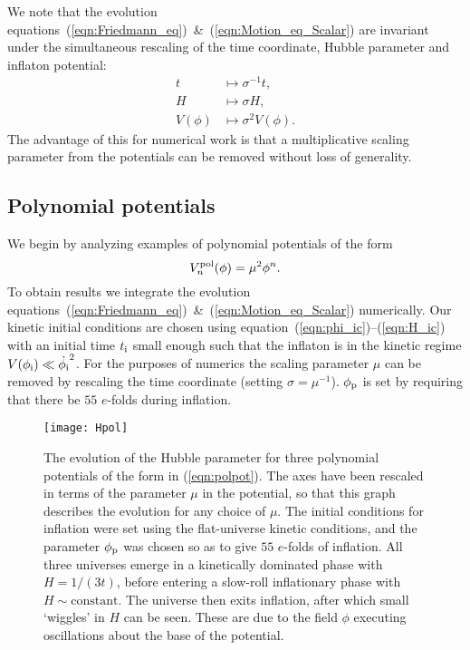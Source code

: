 We note that the evolution equations~(\ref{eqn:Friedmann_eq})~\&~(\ref{eqn:Motion_eq_Scalar}) are invariant under  the simultaneous rescaling of the time coordinate, Hubble parameter and inflaton potential:
%
\begin{align}
  t 
  &\longmapsto 
  \sigma^{-1}t,
  \\
  H 
  &\longmapsto 
  \sigma H,
  \\
  V(\phi) 
  &\longmapsto
  \sigma^2 V(\phi).
\end{align}
%
The advantage of this for numerical work is that a multiplicative scaling parameter from the potentials can be removed without loss of generality.


\subsection{Polynomial potentials}
\label{sec:section_polynomial_potentials}
We begin by analyzing examples of polynomial potentials of the form
%
\begin{equation}
  V^\mathrm{pol}_n(\phi) = \mu^2\phi^n.
  \label{eqn:polpot}
\end{equation}
%
To obtain results we integrate the evolution equations~(\ref{eqn:Friedmann_eq})~\&~(\ref{eqn:Motion_eq_Scalar}) numerically.  Our kinetic initial conditions are chosen using equation~(\ref{eqn:phi_ic})--(\ref{eqn:H_ic}) with an initial time $t_{\mathrm{i}}$ small enough such that the inflaton is in the kinetic regime $V(\phi_{\mathrm{i}})\ll\dot{\phi_{\mathrm{i}}}^2$. For the purposes of numerics the scaling parameter $\mu$ can be removed by rescaling the time coordinate (setting $\sigma=\mu^{-1}$). $\phi_{\mathrm{p}}$ is set by requiring that there be $55$ $e$-folds during inflation.

%
\begin{figure}
  \texttt{[image: Hpol]}
  \caption{The evolution of the Hubble parameter for three polynomial potentials of the form in (\ref{eqn:polpot}). The axes have been rescaled in terms of the parameter $\mu$ in the potential, so that this graph describes the evolution for any choice of $\mu$. The initial conditions for inflation were set using the flat-universe kinetic conditions, and the parameter $\phi_{\mathrm{p}}$ was chosen so as to give $55$ $e$-folds of inflation. All three universes emerge in a kinetically dominated phase with $H=1/(3t)$, before entering a slow-roll inflationary phase with $H\sim\mathrm{constant}$. The universe then exits inflation, after which small `wiggles' in $H$ can be seen. These are due to the field $\phi$ executing oscillations about the base of the potential.}
  \label{fig:figure_Hpol}
\end{figure}
%

